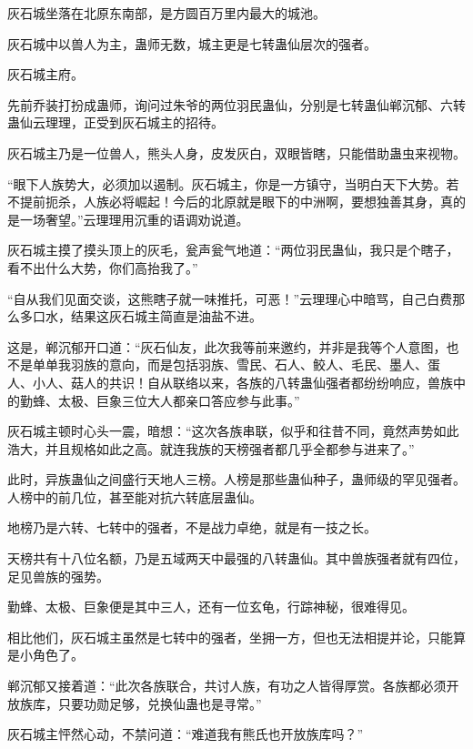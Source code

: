 
\begin{this_body}

灰石城坐落在北原东南部，是方圆百万里内最大的城池。

灰石城中以兽人为主，蛊师无数，城主更是七转蛊仙层次的强者。

灰石城主府。

先前乔装打扮成蛊师，询问过朱爷的两位羽民蛊仙，分别是七转蛊仙郸沉郁、六转蛊仙云理理，正受到灰石城主的招待。

灰石城主乃是一位兽人，熊头人身，皮发灰白，双眼皆瞎，只能借助蛊虫来视物。

“眼下人族势大，必须加以遏制。灰石城主，你是一方镇守，当明白天下大势。若不提前扼杀，人族必将崛起！今后的北原就是眼下的中洲啊，要想独善其身，真的是一场奢望。”云理理用沉重的语调劝说道。

灰石城主摸了摸头顶上的灰毛，瓮声瓮气地道：“两位羽民蛊仙，我只是个瞎子，看不出什么大势，你们高抬我了。”

“自从我们见面交谈，这熊瞎子就一味推托，可恶！”云理理心中暗骂，自己白费那么多口水，结果这灰石城主简直是油盐不进。

这是，郸沉郁开口道：“灰石仙友，此次我等前来邀约，并非是我等个人意图，也不是单单我羽族的意向，而是包括羽族、雪民、石人、鲛人、毛民、墨人、蛋 人、小人、菇人的共识！自从联络以来，各族的八转蛊仙强者都纷纷响应，兽族中的勤蜂、太极、巨象三位大人都亲口答应参与此事。”

灰石城主顿时心头一震，暗想：“这次各族串联，似乎和往昔不同，竟然声势如此浩大，并且规格如此之高。就连我族的天榜强者都几乎全都参与进来了。”

此时，异族蛊仙之间盛行天地人三榜。人榜是那些蛊仙种子，蛊师级的罕见强者。人榜中的前几位，甚至能对抗六转底层蛊仙。

地榜乃是六转、七转中的强者，不是战力卓绝，就是有一技之长。

天榜共有十八位名额，乃是五域两天中最强的八转蛊仙。其中兽族强者就有四位，足见兽族的强势。

勤蜂、太极、巨象便是其中三人，还有一位玄龟，行踪神秘，很难得见。

相比他们，灰石城主虽然是七转中的强者，坐拥一方，但也无法相提并论，只能算是小角色了。

郸沉郁又接着道：“此次各族联合，共讨人族，有功之人皆得厚赏。各族都必须开放族库，只要功勋足够，兑换仙蛊也是寻常。”

灰石城主怦然心动，不禁问道：“难道我有熊氏也开放族库吗？”


\end{this_body}
